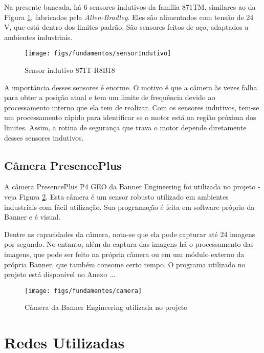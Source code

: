 Na presente bancada, há 6 sensores indutivos da família 871TM, similares ao da Figura \ref{sensorIndutivo}, fabricados pela \textit{Allen-Bradley}. Eles são alimentados com tensão de 24 V, que está dentro dos limites padrão. São sensores feitos de aço, adaptados a ambientes industriais.

\begin{figure}[!ht]
  \centering
    \texttt{[image: figs/fundamentos/sensorIndutivo]}
    \caption{Sensor indutivo 871T-R8B18 \cite{redytton}\label{sensorIndutivo}}
\end{figure}

A importância desses sensores é enorme. O motivo é que a câmera às vezes falha para obter a posição atual e tem um limite de frequência devido ao processamento interno que ela tem de realizar. Com os sensores indutivos, tem-se um processamento rápido para identificar se o motor está na região próxima dos limites. Assim, a rotina de segurança que trava o motor depende diretamente desses sensores indutivos.

\subsection{Câmera PresencePlus}

A câmera PresencePlus P4 GEO da Banner Engineering foi utilizada no projeto - veja Figura \ref{cameraBanner}. Esta câmera é um sensor robusto utilizado em ambientes industriais com fácil utilização. Sua programação é feita em software próprio da Banner e é visual.

Dentre as capacidades da câmera, nota-se que ela pode capturar até 24 imagens por segundo. No entanto, além da captura das imagens há o processamento das imagens, que pode ser feito na própria câmera ou em um módulo externo da própria Banner, que também consome certo tempo. O programa utilizado no projeto está disponível no Anexo ...


\begin{figure}[!ht]
  \centering
    \texttt{[image: figs/fundamentos/camera]}
    \caption{Câmera da Banner Engineering utilizada no projeto \cite{redytton}\label{cameraBanner}}
\end{figure}

\section{Redes Utilizadas}

